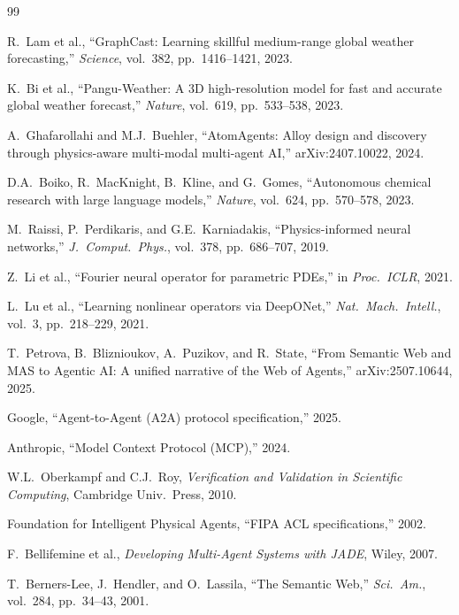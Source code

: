 \documentclass[conference]{IEEEtran}
\begin{document}
\begin{thebibliography}{99}

R.~Lam et al., ``GraphCast: Learning skillful medium-range global weather forecasting,'' \emph{Science}, vol.~382, pp.~1416--1421, 2023.

K.~Bi et al., ``Pangu-Weather: A 3D high-resolution model for fast and accurate global weather forecast,'' \emph{Nature}, vol.~619, pp.~533--538, 2023.

A.~Ghafarollahi and M.J.~Buehler, ``AtomAgents: Alloy design and discovery through physics-aware multi-modal multi-agent AI,'' arXiv:2407.10022, 2024.

D.A.~Boiko, R.~MacKnight, B.~Kline, and G.~Gomes, ``Autonomous chemical research with large language models,'' \emph{Nature}, vol.~624, pp.~570--578, 2023.

M.~Raissi, P.~Perdikaris, and G.E.~Karniadakis, ``Physics-informed neural networks,'' \emph{J.~Comput.\ Phys.}, vol.~378, pp.~686--707, 2019.

Z.~Li et al., ``Fourier neural operator for parametric PDEs,'' in \emph{Proc.\ ICLR}, 2021.

L.~Lu et al., ``Learning nonlinear operators via DeepONet,'' \emph{Nat.\ Mach.\ Intell.}, vol.~3, pp.~218--229, 2021.

T.~Petrova, B.~Bliznioukov, A.~Puzikov, and R.~State, ``From Semantic Web and MAS to Agentic AI: A unified narrative of the Web of Agents,'' arXiv:2507.10644, 2025.

Google, ``Agent-to-Agent (A2A) protocol specification,'' 2025.

Anthropic, ``Model Context Protocol (MCP),'' 2024.

W.L.~Oberkampf and C.J.~Roy, \emph{Verification and Validation in Scientific Computing}, Cambridge Univ.\ Press, 2010.

Foundation for Intelligent Physical Agents, ``FIPA ACL specifications,'' 2002.

F.~Bellifemine et al., \emph{Developing Multi-Agent Systems with JADE}, Wiley, 2007.

T.~Berners-Lee, J.~Hendler, and O.~Lassila, ``The Semantic Web,'' \emph{Sci.\ Am.}, vol.~284, pp.~34--43, 2001.


\end{thebibliography}
\end{document}
